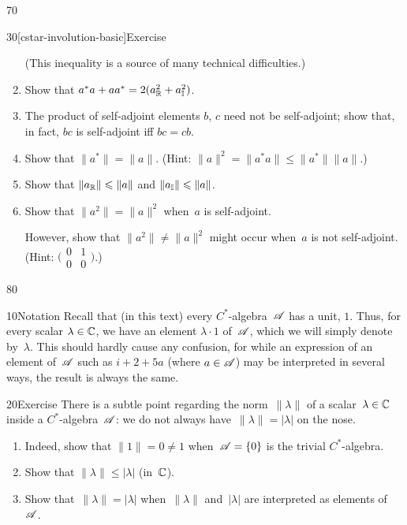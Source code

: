 \begin{parsec}{70}
\begin{point}{30}[cstar-involution-basic]{Exercise}
\begin{enumerate}
(This inequality is a source of many technical difficulties.)
\item
Show that $a^*a+aa^* = 2(a_{\mathbb{R}}^2+a_{\mathbb{I}}^2)$.
\item
The product of self-adjoint elements $b$, $c$ need not be self-adjoint;
show that, in fact, $bc$ is self-adjoint iff $bc=cb$.
\item
Show that $\|a^*\| = \|a\|$. (Hint:  $\|a\|^2=\|a^*a\|\leq \|a^*\|\|a\|$.)

\item
Show that $\|a_{\mathbb{R}}\|\leqslant \|a\|$ and $\|a_{\mathbb{I}}\|\leqslant \|a\|$.
\item
Show that $\|a^2\|=\|a\|^2$ when~$a$ is self-adjoint.

However,
show that $\|a^2\|\neq \|a\|^2$ might occur
when~$a$ is not self-adjoint.
(Hint: $\bigl(
\begin{smallmatrix}
	0&1\\
	0&0
\end{smallmatrix}
\bigr)$.)

\end{enumerate}
\end{point}
\end{parsec}
\begin{parsec}{80}%
\begin{point}{10}{Notation}%
Recall that (in this text) every $C^*$-algebra~$\mathscr{A}$ has a unit, $1$.
Thus, for every scalar $\lambda\in \mathbb{C}$,
we have an element $\lambda\cdot 1$ of~$\mathscr{A}$,
which we will simply denote by~$\lambda$.
This should hardly cause any confusion,
for while an expression of an element of~$\mathscr{A}$
such as $i+2+5a$ (where $a\in \mathscr{A}$) 
may be interpreted in several ways,
the result is always the same.
\end{point}
\begin{point}{20}{Exercise}%
There is a subtle point regarding
the norm~$\|\lambda\|$ of a
scalar~$\lambda\in \mathbb{C}$ inside a $C^*$-algebra~$\mathscr{A}$:
	we do not always have~$\|\lambda\|=\left|\lambda\right|$
	on the nose.
\begin{enumerate}
\item
Indeed, show 
that $\|1\|=0\neq 1$ when~$\mathscr{A}=\{0\}$ is the trivial $C^*$-algebra.
\item 
Show that $\|\lambda\|\leq \left| \lambda\right|$ (in~$\mathbb{C}$).
\item
Show that~$\|\lambda\|=\left|\lambda\right|$
when~$\|\lambda\|$ and~$\left|\lambda\right|$
are interpreted as elements of~$\mathscr{A}$.
\end{enumerate}
\end{point}
\end{parsec}
